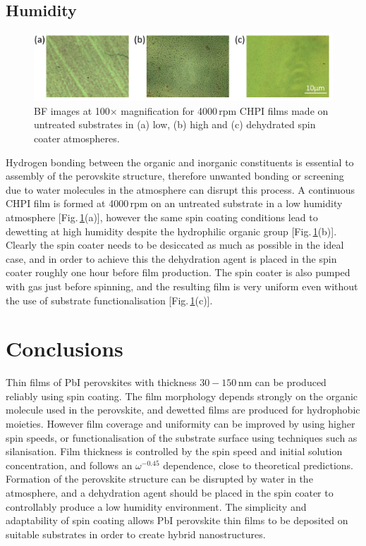 \subsection{Humidity}
\begin{figure}[] 
\centering    
\includegraphics[width=\textwidth]{Fig8}
\caption{BF images at 100$\times$ magnification for 4000\,rpm CHPI films made on untreated substrates in (a) low, (b) high and (c) dehydrated spin coater atmospheres.}
\label{4Fig8}
\end{figure}
Hydrogen bonding between the organic and inorganic constituents is essential to assembly of the perovskite structure, therefore unwanted bonding or screening due to water molecules in the atmosphere can disrupt this process. A continuous CHPI film is formed at 4000\,rpm on an untreated substrate in a low humidity atmosphere [Fig.\,\ref{4Fig8}(a)], however the same spin coating conditions lead to dewetting at high humidity despite the hydrophilic organic group [Fig.\,\ref{4Fig8}(b)]. Clearly the spin coater needs to be desiccated as much as possible in the ideal case, and in order to achieve this the dehydration agent  is placed in the spin coater roughly one hour before film production. The spin coater is also pumped with  gas just before spinning, and the resulting film is very uniform even without the use of substrate functionalisation [Fig.\,\ref{4Fig8}(c)].

\section{Conclusions}
Thin films of PbI perovskites with thickness $30-150$\,nm can be produced reliably using spin coating. The film morphology depends strongly on the organic molecule used in the perovskite, and dewetted films are produced for hydrophobic moieties. However film coverage and uniformity can be improved by using higher spin speeds, or functionalisation of the substrate surface using techniques such as silanisation. Film thickness is controlled by the spin speed and initial solution concentration, and follows an $\omega^{-0.45}$ dependence, close to theoretical predictions. Formation of the perovskite structure can be disrupted by water in the atmosphere, and a dehydration agent should be placed in the spin coater to controllably produce a low humidity environment. The simplicity and adaptability of spin coating allows PbI perovskite thin films to be deposited on suitable substrates in order to create hybrid nanostructures.